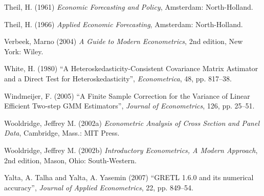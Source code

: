 \begin{thebibliography}
  Theil, H. (1961) \emph{Economic Forecasting and Policy}, Amsterdam:
  North-Holland.

  Theil, H. (1966) \emph{Applied Economic Forecasting}, Amsterdam:
  North-Holland.

  Verbeek, Marno (2004) \emph{A Guide to Modern Econometrics}, 2nd
  edition, New York: Wiley.

  White, H. (1980) ``A Heteroskedasticity-Consistent Covariance Matrix
  Astimator and a Direct Test for Heteroskedasticity'',
  \emph{Econometrica}, 48, pp. 817--38.

  Windmeijer, F. (2005) ``A Finite Sample Correction for the Variance
  of Linear Efficient Two-step GMM Estimators'', \emph{Journal of
    Econometrics}, 126, pp. 25--51.
  
  Wooldridge, Jeffrey M. (2002a) \emph{Econometric Analysis of Cross
    Section and Panel Data}, Cambridge, Mass.: MIT Press.

  Wooldridge, Jeffrey M. (2002b) \emph{Introductory Econometrics, A
    Modern Approach}, 2nd edition, Mason, Ohio: South-Western.

  Yalta, A. Talha and Yalta, A. Yasemin (2007) ``GRETL 1.6.0 and its
  numerical accuracy'', \emph{Journal of Applied Econometrics}, 22,
  pp. 849--54.

\end{thebibliography}


